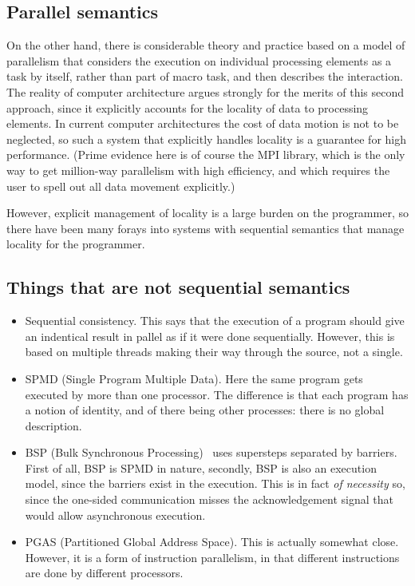 \documentclass[11pt,fleqn,preprint]{impreport}
\begin{document}
\subsection{Parallel semantics}

On the other hand, there is considerable theory and practice
based on a model of parallelism
that considers the execution on individual processing elements
as a task by itself, rather than part of macro task,
and then describes the interaction.
The reality of computer architecture argues strongly for the 
merits of this second approach, since it explicitly
accounts for the locality of data to processing elements.
In current computer architectures the cost of data motion
is not to be neglected, so such a system that 
explicitly handles locality is a guarantee for high performance.
(Prime evidence here is of course the MPI library, which is the only
way to get million-way parallelism with high efficiency,
and which requires the user to spell out all data movement
explicitly.)

However, explicit management of locality is a large burden
on the programmer, so there have been many forays into 
systems with sequential semantics that manage locality
for the programmer.

\subsection{Things that are not sequential semantics}

\begin{itemize}
\item Sequential consistency. This says that the execution of a
  program should give an indentical result in pallel as if it were
  done sequentially. However, this is based on multiple threads making their
  way through the source, not a single.
\item SPMD (Single Program Multiple Data). Here the same program gets executed
  by more than one processor. The difference is that each program has a notion
  of identity, and of there being other processes: there is no global description.
\item BSP (Bulk Synchronous Processing)~\cite{Valiant:1990:BSP} uses supersteps
  separated by barriers. First of all, BSP is SPMD in nature, secondly, BSP
  is also an execution model, since the barriers exist in the execution.
  This is in fact \emph{of necessity} so, since the one-sided communication
  misses the acknowledgement signal that would allow asynchronous execution.
\item PGAS (Partitioned Global Address Space). This is actually somewhat close.
  However, it is a form of instruction parallelism, in that different instructions
  are done by different processors.
\end{itemize}
\end{document}
